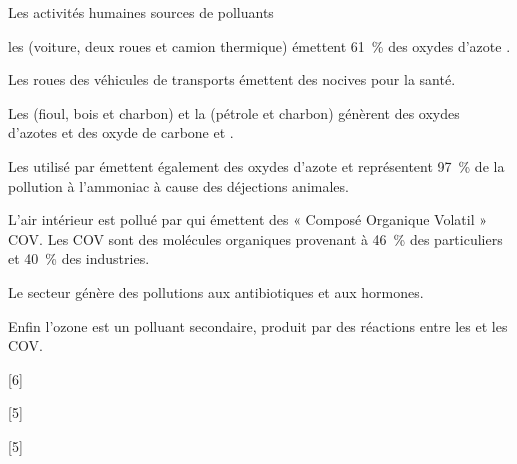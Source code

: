 \begin{doc}{Les activités humaines sources de polluants}
  \begin{listePoints}
    \item les  (voiture, deux roues et camion thermique) émettent \qty{61}{\percent} des oxydes d'azote .
    \item Les roues des véhicules de transports émettent des  nocives pour la santé.
    \item Les  (fioul, bois et charbon) et la  (pétrole et charbon) génèrent des oxydes d'azotes  et des oxyde de carbone  et \dioxydeDeCarbone.
    \item Les  utilisé par  émettent également des oxydes d'azote  et représentent \qty{97}{\percent} de la pollution à l'ammoniac \ammoniac à cause des déjections animales.
    \item L'air intérieur est pollué par  qui émettent des « Composé Organique Volatil » COV.
    Les COV sont des molécules organiques provenant à \qty{46}{\percent} des particuliers et \qty{40}{\percent} des industries.
    \item Le secteur  génère des pollutions aux antibiotiques et aux hormones.
    \item Enfin l'ozone est un polluant secondaire, produit par des réactions entre les  et les COV.
  \end{listePoints}
\end{doc}

[6]

[5]

[5]